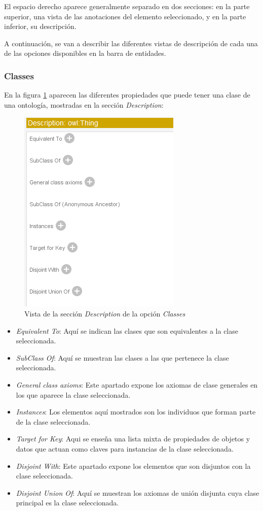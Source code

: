 El espacio derecho aparece generalmente separado en dos secciones: en la parte superior, una vista de las 
anotaciones del elemento seleccionado, y en la parte inferior, su descripción.\medskip

A continuación, se van a describir las diferentes vistas de descripción de cada una de las opciones disponibles en la barra de 
entidades.

\subsubsection{Classes}
En la figura \ref*{Class_details} aparecen las diferentes propiedades que puede tener una clase de una ontología, 
mostradas en la sección \textit{Description}:

\begin{figure}[H]
    \centering
    \includegraphics[scale=0.6]{Figures/Protege/Class_description.png}
    \caption{Vista de la sección \textit{Description} de la opción \textit{Classes}}
    \label{Class_details}
\end{figure}

\begin{itemize}
    \item \textit{Equivalent To}: Aquí se indican las clases que son equivalentes a la clase seleccionada.
    \item \textit{SubClass Of}: Aquí se muestran las clases a las que pertenece la clase seleccionada.
    \item \textit{General class axioms}: Este apartado expone los axiomas de clase generales en los que aparece la 
    clase seleccionada.
    \item \textit{Instances}: Los elementos aquí mostrados son los individuos que forman parte de la clase seleccionada.
    \item \textit{Target for Key}: Aqui se enseña una lista mixta de propiedades de objetos y datos que actuan como 
    claves para instancias de la clase seleccionada.
    \item \textit{Disjoint With}: Este apartado expone los elementos que son disjuntos con la clase seleccionada.
    \item \textit{Disjoint Union Of}: Aquí se muestran los axiomas de unión disjunta cuya clase principal es la clase seleccionada.
\end{itemize}


